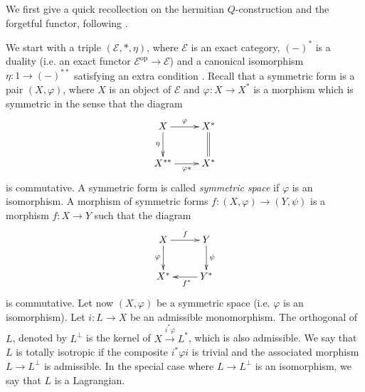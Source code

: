 \begin{num}
We first give a quick recollection on the hermitian $Q$-construction and the forgetful functor, following \cite{Schlichting09}.

We start with a triple $(\mathcal{E},*,\eta)$, where $\mathcal{E}$ is an exact category, $(-)^*$ is a duality (i.e. an exact functor $\mathcal E^{\mathrm{op}}\to \mathcal{E}$) and a canonical isomorphism $\eta:1\to (-)^{**}$ satisfying an extra condition \cite[Definition 2.1]{Schlichting09}. Recall that a symmetric form is a pair $(X,\varphi)$, where $X$ is an object of $\mathcal{E}$ and $\varphi:X\to X^*$ is a morphism which is symmetric in the sense that the diagram
\[
\xymatrix{X\ar[r]^-{\varphi}\ar[d]_-{\eta} & X^*\ar@{=}[d] \\
X^{**}\ar[r]_-{\varphi*} & X^*}
\]
is commutative. A symmetric form is called \emph{symmetric space} if $\varphi$ is an isomorphism. A morphism of symmetric forms $f:(X,\varphi)\to (Y,\psi)$ is a morphism $f:X\to Y$ such that the diagram
\[
\xymatrix{X\ar[r]^-f\ar[d]_-{\varphi} & Y\ar[d]^-\psi \\
X^* & Y^*\ar[l]^/-2pt/{f^*}}
\]
is commutative. Let now $(X,\varphi)$ be a symmetric space (i.e. $\varphi$ is an isomorphism). Let $i:L\to X$ be an admissible monomorphism. The orthogonal of $L$, denoted by $L^{\perp}$ is the kernel of $X\xrightarrow{i^*\varphi} L^*$, which is also admissible. We say that $L$ is totally isotropic if the composite $i^*\varphi i$ is trivial and the associated morphism $L\to L^{\perp}$ is admissible. In the special case where $L\to L^{\perp}$ is an isomorphism, we say that $L$ is a Lagrangian.



\end{num}
